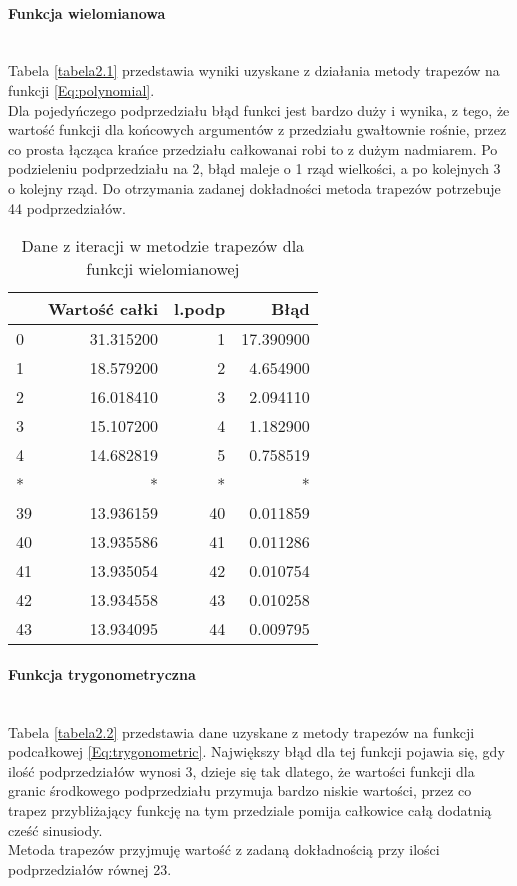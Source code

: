 \documentclass[12pt,twoside]{article}
\begin{document}
\paragraph{Funkcja wielomianowa}\mbox{} \\

Tabela \eqref{tabela2.1} przedstawia wyniki uzyskane z działania metody trapezów na funkcji \eqref{Eq:polynomial}.\\
Dla pojedyńczego podprzedziału błąd funkci jest bardzo duży i wynika, z tego, że wartość funkcji dla końcowych argumentów z przedziału gwałtownie rośnie, przez co prosta łącząca krańce przedziału całkowanai robi to z dużym nadmiarem. Po podzieleniu podprzedziału na 2, błąd maleje o 1 rząd wielkości, a po kolejnych 3 o kolejny rząd. Do otrzymania zadanej dokładności metoda trapezów potrzebuje 44 podprzedziałów.
\begin{table}[ht]
\centering 
\caption{Dane z iteracji w metodzie trapezów dla funkcji wielomianowej}
\label{tabela2.1}
\begin{tabular}{lrrr}
\toprule
{} &  Wartość całki &  l.podp &       Błąd \\
\midrule
0  &      31.315200 &       1 &  17.390900 \\
1  &      18.579200 &       2 &   4.654900 \\
2  &      16.018410 &       3 &   2.094110 \\
3  &      15.107200 &       4 &   1.182900 \\
4  &      14.682819 &       5 &   0.758519 \\
* &      * &      * &   * \\
39 &      13.936159 &      40 &   0.011859 \\
40 &      13.935586 &      41 &   0.011286 \\
41 &      13.935054 &      42 &   0.010754 \\
42 &      13.934558 &      43 &   0.010258 \\
43 &      13.934095 &      44 &   0.009795 \\
\bottomrule
\end{tabular}
\end{table}


\paragraph{Funkcja trygonometryczna}\mbox{} \\

Tabela \eqref{tabela2.2} przedstawia dane uzyskane z metody trapezów na funkcji podcałkowej \eqref{Eq:trygonometric}. Największy błąd dla tej funkcji pojawia się, gdy ilość podprzedziałów wynosi 3, dzieje się tak dlatego, że wartości funkcji dla granic środkowego podprzedziału przymuja bardzo niskie wartości, przez co trapez przybliżający funkcję na tym przedziale pomija całkowice całą dodatnią cześć sinusiody.\\
Metoda trapezów przyjmuję wartość z zadaną dokładnością przy ilości podprzedziałów równej 23.
\end{document}

